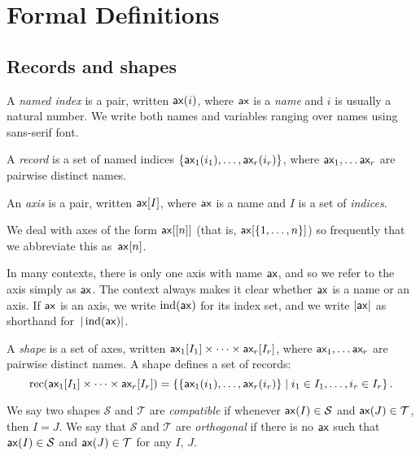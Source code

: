 \documentclass{article}
\DeclareMathOperator{\ind}{ind}
\DeclareMathOperator{\rec}{rec}
\begin{document}
\section{Formal Definitions}
\label{sec:definitions}

\newcommand{\sub}[1]{_\text{$#1$}}

\subsection{Records and shapes}

A \emph{named index} is a pair, written $\mathsf{ax}(i)$, where $\mathsf{ax}$ is a \emph{name} and $i$ is usually a natural number. We write both names and variables ranging over names using sans-serif font.

A \emph{record} is a set of named indices $\{\nidx{ax\sub{1}}{i_1}, \ldots, \nidx{ax\sub{r}}{i_r}\}$, where $\name{ax\sub{1}}, \ldots \name{ax\sub{r}}$ are pairwise distinct names. 

An \emph{axis} is a pair, written $\mathsf{ax}[I]$, where $\mathsf{ax}$ is a name and $I$ is a set of \emph{indices}.

We deal with axes of the form $\mathsf{ax}[[n]]$ (that is, $\mathsf{ax}[\{1, \ldots, n\}]$) so frequently that we abbreviate this as~$\mathsf{ax}[n]$.

In many contexts, there is only one axis with name $\mathsf{ax}$, and so we refer to the axis simply as $\mathsf{ax}$. The context always makes it clear whether $\mathsf{ax}$ is a name or an axis. If $\mathsf{ax}$ is an axis, we write $\ind(\name{ax})$ for its index set, and we write $|\mathsf{ax}|$ as shorthand for~$|\ind(\name{ax})|$.

A \emph{shape} is a set of axes, written $\nset{ax\sub{1}}{I_1} \times \cdots \times \nset{ax\sub{r}}{I_r}$, where $\name{ax\sub{1}}, \ldots \name{ax\sub{r}}$ are pairwise distinct names. A shape defines a set of records:
\begin{equation*}
\rec (\nset{ax\sub{1}}{I_1} \times \cdots \times \nset{ax\sub{r}}{I_r}) = \left\{\{\nidx{ax\sub{1}}{i_1}, \ldots, \nidx{ax\sub{r}}{i_r}\} \mid i_1 \in I_1, \ldots, i_r \in I_r\right\}.
\end{equation*}

We say two shapes $\mathcal{S}$ and $\mathcal{T}$ are \emph{compatible} if whenever $\mathsf{ax}(I) \in \mathcal{S}$ and $\mathsf{ax}(J) \in \mathcal{T}$, then $I = J$. We say that $\mathcal{S}$ and $\mathcal{T}$ are \emph{orthogonal} if there is no $\mathsf{ax}$ such that $\mathsf{ax}(I) \in \mathcal{S}$ and $\mathsf{ax}(J) \in \mathcal{T}$ for any $I$, $J$.
\end{document}
